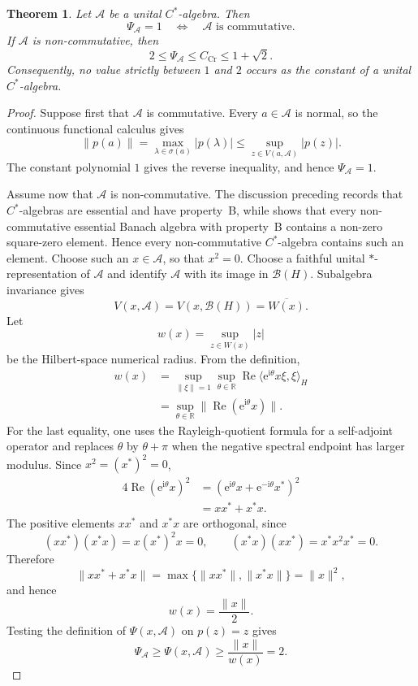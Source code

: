 \documentclass[a4paper]{amsart}
\newtheorem{theorem}{Theorem}[section]
\theoremstyle{remark}
\newcommand{\calA}{\mathcal A}
\newcommand{\calB}{\mathcal B}
\begin{document}
\begin{theorem}\label{thm:cstar-gap}
Let \(\calA\) be a unital \(C^*\)-algebra.  Then
\[
       \Psi_{\calA}=1
       \quad\Longleftrightarrow\quad
       \calA\text{ is commutative}.
\]
If \(\calA\) is non-commutative, then
\[
       2\leqslant\Psi_{\calA}\leqslant C_{\mathrm{Cr}}
       \leqslant1+\sqrt2.
\]
Consequently, no value strictly between \(1\) and \(2\) occurs as the
constant of a unital \(C^*\)-algebra.
\end{theorem}

\begin{proof}
Suppose first that \(\calA\) is commutative.  Every \(a\in\calA\) is normal,
so the continuous functional calculus gives
\[
       \|p(a)\|=\max_{\lambda\in\sigma(a)}|p(\lambda)|
       \leqslant\sup_{z\in V(a,\calA)}|p(z)|.
\]
The constant polynomial \(1\) gives the reverse inequality, and hence
\(\Psi_{\calA}=1\).

Assume now that \(\calA\) is non-commutative.  The discussion preceding
\cite[Theorem~2.1]{AlaminosSquareZero} records that \(C^*\)-algebras are
essential and have property~B, while
\cite[Proposition~6.1]{AlaminosSquareZero} shows that every non-commutative
essential Banach algebra with property~B contains a non-zero square-zero
element.  Hence every non-commutative \(C^*\)-algebra contains such an
element.
Choose such an \(x\in\calA\), so that \(x^2=0\).  Choose a
faithful unital \(*\)-representation of \(\calA\) and identify \(\calA\) with
its image in \(\calB(H)\).  Subalgebra invariance gives
\[
       V(x,\calA)=V(x,\calB(H))=\overline{W(x)}.
\]
Let
\[
       w(x)=\sup_{z\in W(x)}|z|
\]
be the Hilbert-space numerical radius.  From the definition,
\[
\begin{split}
       w(x)
       &=\sup_{\|\xi\|=1}\sup_{\theta\in\mathbb R}
          \operatorname{Re}\langle
             \mathrm e^{\mathrm i\theta}x\xi,\xi\rangle_H\\
       &=\sup_{\theta\in\mathbb R}
          \bigl\|\operatorname{Re}(\mathrm e^{\mathrm i\theta}x)\bigr\|.
\end{split}
\]
For the last equality, one uses the Rayleigh-quotient formula for a
self-adjoint operator and replaces \(\theta\) by \(\theta+\pi\) when the
negative spectral endpoint has larger modulus.  Since \(x^2=(x^*)^2=0\),
\[
\begin{split}
       4\operatorname{Re}(\mathrm e^{\mathrm i\theta}x)^2
       &=(\mathrm e^{\mathrm i\theta}x+
          \mathrm e^{-\mathrm i\theta}x^*)^2\\
       &=xx^*+x^*x.
\end{split}
\]
The positive elements \(xx^*\) and \(x^*x\) are orthogonal, since
\[
       (xx^*)(x^*x)=x(x^*)^2x=0,
       \qquad
       (x^*x)(xx^*)=x^*x^2x^*=0.
\]
Therefore
\[
       \|xx^*+x^*x\|
       =\max\{\|xx^*\|,\|x^*x\|\}
       =\|x\|^2,
\]
and hence
\[
       w(x)=\frac{\|x\|}{2}.
\]
Testing the definition of \(\Psi(x,\calA)\) on \(p(z)=z\) gives
\[
       \Psi_{\calA}\geqslant\Psi(x,\calA)
       \geqslant\frac{\|x\|}{w(x)}=2.
\]


\end{proof}
\end{document}
